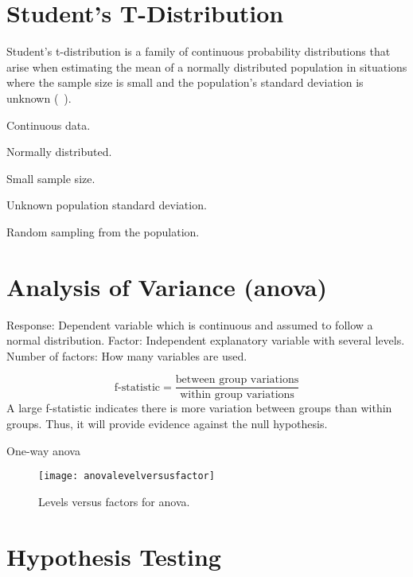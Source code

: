 	\section{Student's T-Distribution}
Student's t-distribution is a family of continuous probability distributions that arise when estimating the mean of a normally distributed population in situations where the sample size is small and the population's standard deviation is unknown (~\cite{ref:wikipediatdistribution}).

	\begin{bulletedlist}
		\item Continuous data.
		\item Normally distributed.
		\item Small sample size.
		\item Unknown population standard deviation.
		\item Random sampling from the population.
	\end{bulletedlist}

	\section{Analysis of Variance (\texorpdfstring{\acrshort{anova}}{ANOVA})}
Response: Dependent variable which is continuous and assumed to follow a normal distribution.
Factor: Independent explanatory variable with several levels.
Number of factors: How many variables are used.

	\begin{equation}
		\textrm{f-statistic} = \frac{\textrm{between group variations}}{\textrm{within group variations}}
	\end{equation}
A large f-statistic indicates there is more variation between groups than within groups.  Thus, it will provide evidence against the null hypothesis.

One-way \acrshort{anova}

	\begin{figure}[tbp]
		\centering
		\texttt{[image: anovalevelversusfactor]}
		\caption[Levels versus factors for ANOVA]{Levels versus factors for \acrshort{anova}.}
		\label{fig:anovalevelversusfactor}
	\end{figure}

	\section{Hypothesis Testing}
